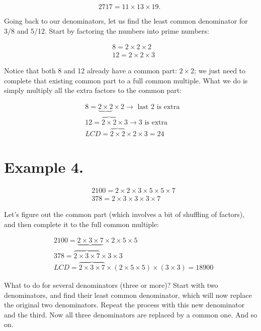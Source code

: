 \documentclass{ximera}
\begin{document}
$$2717=11 \times 13 \times 19 \text {. }$$

Going back to our denominators, let us find the least common denominator for $3 / 8$ and 5/12. Start by factoring the numbers into prime numbers:

$$\begin{aligned}
& 8=2 \times 2 \times 2 \\
& 12=2 \times 2 \times 3
\end{aligned}$$

Notice that both 8 and 12 already have a common part: $2 \times 2$; we just need to complete that existing common part to a full common multiple. What we do is simply multiply all the extra factors to the common part:

$$\begin{aligned}
& 8=\underbrace{2 \times 2} \times 2 \rightarrow \text { last } 2 \text { is extra } \\
& 12=\overbrace{2 \times 2} \times 3 \rightarrow 3 \text { is extra } \\
& L C D=\overbrace{2 \times 2} \times 2 \times 3=24
\end{aligned}$$

\section*{Example 4.}
$$\begin{aligned}
& 2100=2 \times 2 \times 3 \times 5 \times 5 \times 7 \\
& 378=2 \times 3 \times 3 \times 3 \times 7
\end{aligned}$$

Let's figure out the common part (which involves a bit of shuffling of factors), and then complete it to the full common multiple:

$$\begin{aligned}
& 2100=\underbrace{2 \times 3 \times 7} \times 2 \times 5 \times 5 \\
& 378=\overbrace{2 \times 3 \times 7} \times 3 \times 3 \\
& L C D=\overbrace{2 \times 3 \times 7} \times(2 \times 5 \times 5) \times(3 \times 3)=18900
\end{aligned}$$

What to do for several denominators (three or more)? Start with two denominators, and find their least common denominator, which will now replace the original two denominators. Repeat the process with this new denominator and the third. Now all three denominators are replaced by a common one. And so on.
\end{document}
